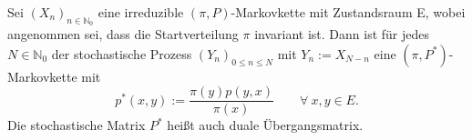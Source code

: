 Sei $(X_{n})_{n \in \mathbb{N}_{0}}$ eine irreduzible $(\pi,P)$-Markovkette mit Zustandsraum E, wobei angenommen sei, dass die Startverteilung $\pi$ invariant ist. Dann ist für jedes $N \in \mathbb{N}_{0}$ der stochastische Prozess $(Y_{n})_{0 \leq n \leq N}$ mit $Y_{n} := X_{N-n}$ eine $(\pi,P^{*})$-Markovkette mit
\begin{equation*}
p^{*}(x,y) := \dfrac{\pi (y) p(y,x)}{\pi(x)} \qquad \forall \: x,y \in E.
\end{equation*}
Die stochastische Matrix $P^{*}$ heißt auch duale Übergangsmatrix.